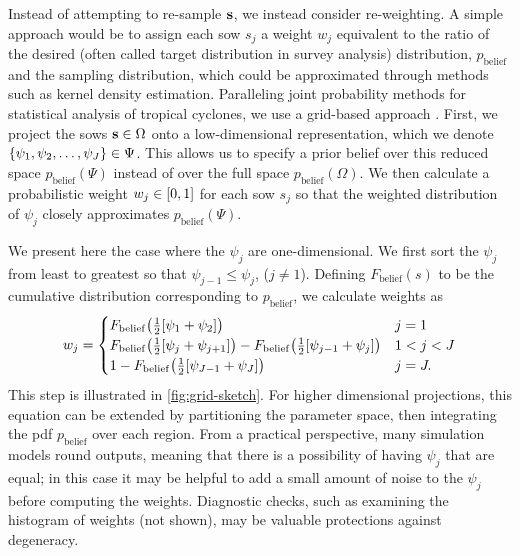 \documentclass[11pt]{article}
\begin{document}
Instead of attempting to re-sample $\vb{s}$, we instead consider re-weighting.
A simple approach would be to assign each \gls{sow} $s_j$ a weight $w_j$ equivalent to the ratio of the desired (often called target distribution in survey analysis) distribution, $p_\mathrm{belief}$ and the sampling distribution, which could be approximated through methods such as kernel density estimation.
Paralleling joint probability methods for statistical analysis of tropical cyclones, we use a grid-based approach \citep{johnson_clara:2013,resio_probabilities:2007,toro_jpm-os:2010}.
First, we project the \glspl{sow} $\vb{s} \in \Omega$ onto a low-dimensional representation, which we denote $\qty{\psi_1, \psi_2, \ldots, \psi_J} \in \Psi$.
This allows us to specify a prior belief over this reduced space $p_\mathrm{belief}(\Psi)$ instead of over the full space $p_\mathrm{belief}(\Omega)$.
We then calculate a probabilistic weight $w_j \in \qty[0, 1]$ for each \gls{sow} $s_j$ so that the weighted distribution of $\psi_j$ closely approximates $p_\mathrm{belief}(\Psi)$.

We present here the case where the $\psi_j$ are one-dimensional.
We first sort the $\psi_j$  from least to greatest so that $\psi_{j-1} \leq \psi_j$, ($j \neq 1$).
Defining $F_\mathrm{belief}(s)$ to be the cumulative distribution corresponding to $p_\mathrm{belief}$, we calculate weights as
\begin{equation}\label{eq:weights}
    w_j = \begin{cases}
        F_\mathrm{belief}\qty(\frac{1}{2}\qty[\psi_1 + \psi_2])                                                                     & j = 1     \\
        F_\mathrm{belief}\qty(\frac{1}{2}\qty[\psi_{j} + \psi_{j+1}]) - F_\mathrm{belief}\qty(\frac{1}{2}\qty[\psi_{j-1} + \psi_j]) & 1 < j < J \\
        1 - F_\mathrm{belief}\qty(\frac{1}{2}\qty[\psi_{J-1} + \psi_J])                                                             & j = J.
    \end{cases}
\end{equation}
This step is illustrated in \cref{fig:grid-sketch}.
For higher dimensional projections, this equation can be extended by partitioning the parameter space, then integrating the \gls{pdf} $p_\mathrm{belief}$ over each region.
From a practical perspective, many simulation models round outputs, meaning that there is a possibility of having $\psi_j$ that are equal; in this case it may be helpful to add a small amount of noise to the $\psi_j$ before computing the weights.
Diagnostic checks, such as examining the histogram of weights (not shown), may be valuable protections against degeneracy.
\end{document}
